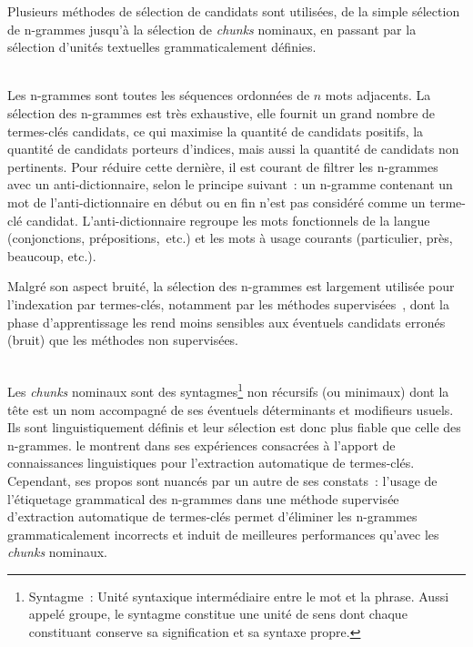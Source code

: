     Plusieurs méthodes de sélection de candidats sont utilisées, de la simple
    sélection de n-grammes jusqu'à la sélection de \textit{chunks} nominaux, en
    passant par la sélection d'unités textuelles grammaticalement définies.

    ~\\Les n-grammes sont toutes
    les séquences ordonnées de $n$ mots adjacents. La sélection des n-grammes
    est très exhaustive, elle fournit un grand nombre de termes-clés candidats,
    ce qui maximise la quantité de candidats positifs, la quantité de candidats
    porteurs d'indices, mais aussi la quantité de candidats non pertinents. Pour
    réduire cette dernière, il est courant de filtrer les n-grammes avec un
    anti-dictionnaire, selon le principe suivant~: un n-gramme
    contenant un mot de l'anti-dictionnaire en début ou en fin n'est pas
    considéré comme un terme-clé candidat. L'anti-dictionnaire regroupe les mots
    fonctionnels de la langue (conjonctions, prépositions,~etc.) et les mots à
    usage courants (\og{}particulier\fg{}, \og{}près\fg{}, \og{}beaucoup\fg{},
    etc.).
    
    Malgré son aspect bruité, la sélection des n-grammes est largement utilisée
    pour l'indexation par termes-clés, notamment par les méthodes
    supervisées~\cite{witten1999kea,turney1999learningalgorithms,hulth2003keywordextraction},
    dont la phase d'apprentissage les rend moins sensibles aux éventuels
    candidats erronés (bruit) que les méthodes non supervisées.

    \begin{example}
    \end{example}

    ~\\Les \textit{chunks} nominaux
    sont des syntagmes\footnote{Syntagme~: Unité syntaxique
    intermédiaire entre le mot et la phrase. Aussi appelé groupe, le syntagme
    constitue une unité de sens dont chaque constituant conserve sa
    signification et sa syntaxe propre.} non récursifs (ou minimaux) dont la
    tête est un nom accompagné de ses éventuels déterminants et modifieurs
    usuels. Ils sont linguistiquement définis et leur sélection est donc plus
    fiable que celle des n-grammes.  le
    montrent dans ses expériences consacrées à l'apport de connaissances
    linguistiques pour l'extraction automatique de termes-clés. Cependant, ses
    propos sont nuancés par un autre de ses constats~: l'usage de l'étiquetage
    grammatical des n-grammes dans une méthode supervisée d'extraction
    automatique de termes-clés permet d'éliminer les n-grammes grammaticalement
    incorrects et induit de meilleures performances qu'avec les \textit{chunks}
    nominaux.


